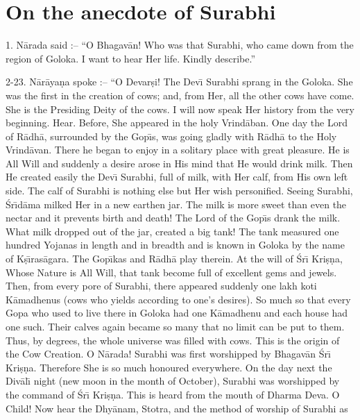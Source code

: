 \chapter{On the anecdote of Surabhi}

1. N\=arada said :-- ``O Bhagav\=an! Who was that Surabhi, who came down from the region of Goloka. I want to hear Her life. Kindly describe.''

2-23. N\=ar\=aya\d{n}a spoke :-- ``O Devar\d{s}i! The Dev\={\i} Surabhi sprang in the Goloka. She was the first in the creation of cows; and, from Her, all the other cows have come. She is the Presiding Deity of the cows. I will now speak Her history from the very beginning. Hear. Before, She appeared in the holy Vrind\=aban. One day the Lord of R\=adh\=a, surrounded by the Gop\={\i}s, was going gladly with R\=adh\=a to the Holy Vrind\=avan. There he began to enjoy in a solitary place with great pleasure. He is All Will and suddenly a desire arose in His mind that He would drink milk. Then He created easily the Dev\={\i} Surabhi, full of milk, with Her calf, from His own left side. The calf of Surabhi is nothing else but Her wish personified. Seeing Surabhi, \'Sr\={\i}d\=ama milked Her in a new earthen jar. The milk is more sweet than even the nectar and it prevents birth and death! The Lord of the Gop\={\i}s drank the milk. What milk dropped out of the jar, created a big tank! The tank measured one hundred Yojanas in length and in breadth and is known in Goloka by the name of K\d{s}\={\i}ras\=agara. The Gop\={\i}kas and R\=adh\=a play therein. At the will of \'Sr\={\i} Kri\d{s}\d{n}a, Whose Nature is All Will, that tank become full of excellent gems and jewels. Then, from every pore of Surabhi, there appeared suddenly one lakh koti K\=amadhenus (cows who yields according to one's desires). So much so that every Gopa who used to live there in Goloka had one K\=amadhenu and each house had one such. Their calves again became so many that no limit can be put to them. Thus, by degrees, the whole universe was filled with cows. This is the origin of the Cow Creation. O N\=arada! Surabhi was first worshipped by Bhagav\=an \'Sr\={\i} Kri\d{s}\d{n}a. Therefore She is so much honoured everywhere. On the day next the Div\=al\={\i} night (new moon in the month of October), Surabhi was worshipped by the command of \'Sr\={\i} Kri\d{s}\d{n}a. This is heard from the mouth of Dharma Deva. O Child! Now hear the Dhy\=anam, Stotra, and the method of worship of Surabhi as

